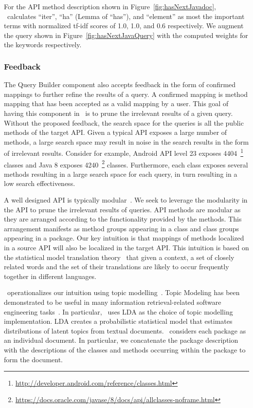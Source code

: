 For the API method description  shown in Figure~\ref{fig:hasNextJavadoc}, \tool\ calculates ``iter'', ``ha'' (Lemma of ``has''), and ``element'' as most the important terms with normalized tf-idf scores of 1.0, 1.0, and 0.6 respectively. We augment the query shown in Figure~\ref{fig:hasNextJavaQuery} with the computed weights for the keywords respectively.

\subsubsection{Feedback}
\label{subsub:querybuilder:feedback}


The Query Builder component also accepts feedback in the form of confirmed mappings to further refine the results of a query.
A confirmed mapping is method mapping that has been accepted as a valid mapping by a user.
This goal of having this component in \tool\ is to prune the irrelevant results of a given query.
Without the proposed feedback, the search space for the queries is all the public methods of the target API.
Given a typical API exposes a large number of methods, a large search space may result in noise in the search results in the form of irrelevant results.
Consider for example, Android API level 23 exposes 4404~\footnote{\url{http://developer.android.com/reference/classes.html}} classes
and Java 8 exposes 4240~\footnote{\url{https://docs.oracle.com/javase/8/docs/api/allclasses-noframe.html}} classes.
Furthermore, each class exposes several methods resulting in a large search space for each query, in turn resulting in a low search effectiveness.

A well designed API is typically modular~\cite{Bloch:2006:OOPSLA:APIDesign}.
We seek to leverage the modularity in the API to prune the irrelevant results of queries.
API methods are modular as they are arranged according to the functionality provided by the methods.
This arrangement manifests as method groups appearing in a class and class groups appearing in a package.
Our key intuition is that mappings of methods localized in a source API will also be localized in the target API.
This intuition is based on the statistical model translation theory~\cite{brown1993mathematics} that given a context, a set of closely related words and the set of their translations are likely to occur frequently together in different languages. 


\tool\ operationalizes our intuition using topic modelling~\cite{blei2003latent,panichella2013effectively}.
Topic Modeling has been demonstrated to be useful in many information retrieval-related software engineering tasks~\cite{Panichella2013:ICSE:TopicModel,Binkley:2014:ULS:2597008.2597150}.
In particular, \tool\ uses LDA as the choice of topic modelling implementation. 
LDA creates a probabilistic statistical model that estimates distributions of latent topics from textual documents.
\tool\ considers each package as an individual document. 
In particular, we concatenate the package description with the descriptions of the classes and methods occurring within the package to form the document.

